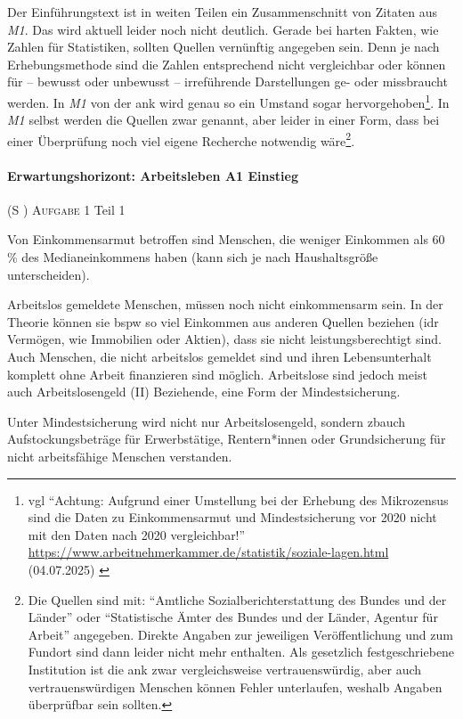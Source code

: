 Der Einführungstext ist in weiten Teilen ein Zusammenschnitt von Zitaten aus \emph{M1}. Das wird aktuell leider noch nicht deutlich. Gerade bei harten Fakten, wie Zahlen für Statistiken, sollten Quellen vernünftig angegeben sein. Denn je nach Erhebungsmethode sind die Zahlen entsprechend nicht vergleichbar oder können für -- bewusst oder unbewusst -- irreführende Darstellungen ge- oder missbraucht werden. In \emph{M1} von der \gls{ank} wird genau so ein Umstand sogar hervorgehoben\footnote{
    \gls{vgl} \enquote{Achtung: Aufgrund einer Umstellung bei der Erhebung des Mikrozensus sind die Daten zu Einkommensarmut und Mindestsicherung vor 2020 nicht mit den Daten nach 2020 vergleichbar!} \url{https://www.arbeitnehmerkammer.de/statistik/soziale-lagen.html} (04.07.2025) \label{MikrozensusNichtVgl.bar2020}}. 
In \emph{M1} selbst werden die Quellen zwar genannt, aber leider in einer Form, dass bei einer Überprüfung noch viel eigene Recherche notwendig wäre\footnote{
    Die Quellen sind mit: \enquote{Amtliche Sozialberichterstattung des Bundes und der Länder} oder \enquote{Statistische Ämter des Bundes und der Länder, Agentur für Arbeit} angegeben. Direkte Angaben zur jeweiligen Veröffentlichung und zum Fundort sind dann leider nicht mehr enthalten. Als gesetzlich festgeschriebene Institution ist die \gls{ank} zwar vergleichsweise vertrauenswürdig, aber auch vertrauenswürdigen Menschen können Fehler unterlaufen, weshalb Angaben überprüfbar sein sollten.}.



\paragraph{Erwartungshorizont: Arbeitsleben A1 Einstieg} (\gls{S} \pageref{ARBEITSLEBEN-A1})
\textsc{Aufgabe 1} Teil 1 \quad
\begin{myitemize}
    \item Von Einkommensarmut betroffen sind Menschen, die weniger Einkommen als 60\,\% des Medianeinkommens haben (kann sich je nach Haushaltsgröße unterscheiden). 
    \item Arbeitslos gemeldete Menschen, müssen noch nicht einkommensarm sein. In der Theorie können sie \gls{bspw} so viel Einkommen aus anderen Quellen beziehen (\gls{idr} Vermögen, wie Immobilien oder Aktien), dass sie nicht leistungsberechtigt sind. Auch Menschen, die nicht arbeitslos gemeldet sind und ihren Lebensunterhalt komplett ohne Arbeit finanzieren sind möglich. Arbeitslose sind jedoch meist auch Arbeitslosengeld (II) Beziehende, eine Form der Mindestsicherung. 
    \item Unter Mindestsicherung wird nicht nur Arbeitslosengeld, sondern \gls{zb}auch Aufstockungsbeträge für Erwerbstätige, Rentern*innen oder Grundsicherung für nicht arbeitsfähige Menschen verstanden. 
\end{myitemize}

